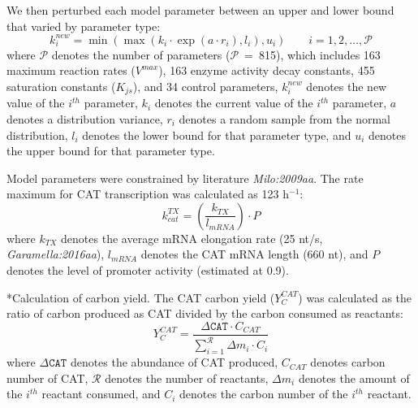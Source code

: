 \documentclass[12pt]{article}
\makeatletter
\renewcommand\subsection{\@startsection
	{subsection}{2}{0mm}
	{-0.05in}
	{-0.5\baselineskip}
	{\normalfont\normalsize\bfseries}}
\makeatother
\begin{document}
We then perturbed each model parameter between an upper and lower bound that varied by parameter type:
\begin{equation}\label{eqn:parameter-perturbation}
    k_i^{new}=\min\left(\max\left(k_i \cdot \exp(a \cdot r_i),l_i\right),u_i\right)\qquad{i=1,2,\hdots,\mathcal{P}}
\end{equation}
where $\mathcal{P}$ denotes the number of parameters ($\mathcal{P}$~=~815), which includes 163 maximum reaction rates ($V^{max}$), 163 enzyme activity decay constants, 455 saturation constants ($K_{js}$), and 34 control parameters, $k_i^{new}$ denotes the new value of the $i^{th}$ parameter, $k_i$ denotes the current value of the $i^{th}$ parameter, $a$ denotes a distribution variance, $r_i$ denotes a random sample from the normal distribution, $l_i$ denotes the lower bound for that parameter type, and $u_i$ denotes the upper bound for that parameter type.

Model parameters were constrained by literature \textit{Milo:2009aa}.
The rate maximum for CAT transcription was calculated as 123 h$^{-1}$:
\begin{equation}\label{eqn:transcription_rate}
	k_{cat}^{TX}=\left(\frac{k_{TX}}{l_{mRNA}}\right)\cdot P
\end{equation}
where $k_{TX}$ denotes the average mRNA elongation rate (25 nt/s, \textit{Garamella:2016aa}), $l_{mRNA}$ denotes the CAT mRNA length (660 nt), and $P$ denotes the level of promoter activity (estimated at 0.9).

\subsection*{Calculation of carbon yield.}
The CAT carbon yield ($Y_{C}^{CAT}$) was calculated as the ratio of carbon produced as CAT divided by the carbon consumed as reactants:
\begin{equation}\label{eqn:yield-definition}
	Y_{C}^{CAT}=\frac{\Delta\texttt{CAT}\cdot C_{CAT}}{\displaystyle\sum_{i=1}^{\mathcal{R}}\Delta m_{i}\cdot C_i}
\end{equation}
where $\Delta\texttt{CAT}$ denotes the abundance of CAT produced, $C_{CAT}$ denotes carbon number of CAT, $\mathcal{R}$ denotes the number of reactants, $\Delta m_{i}$ denotes the amount of the $i^{th}$ reactant consumed, and $C_i$ denotes the carbon number of the $i^{th}$ reactant.
\end{document}
